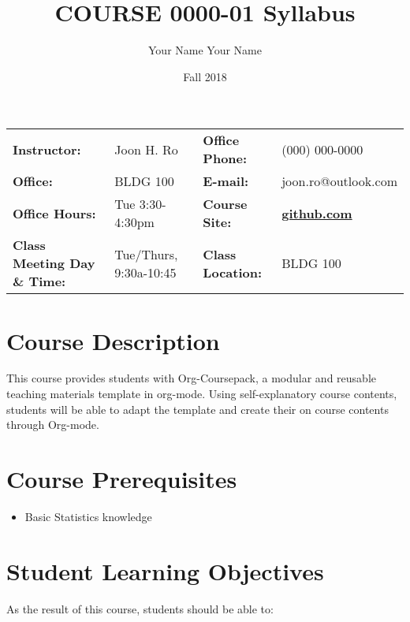 \documentclass[article,letterpaper,times,10pt,listings-bw,microtype]{scrartcl}
\author{Your Name Your Name}
\date{Fall 2018}
\title{COURSE 0000-01 Syllabus}
\begin{document}

\begin{center}
{}
\end{center}

\begin{center}
{}
\end{center}

\vspace{5 mm}

\begin{center}
\begin{tabular}{llll}
\textbf{Instructor:} & Joon H. Ro & \textbf{Office Phone:} & (000) 000-0000\\
\textbf{Office:} & BLDG 100 & \textbf{E-mail:} & joon.ro@outlook.com\\
\textbf{Office Hours:} & Tue 3:30-4:30pm & \textbf{Course Site:} & \textbf{\href{https://github.com}{github.com}}\\
\textbf{Class Meeting Day \& Time:} & Tue/Thurs, 9:30a-10:45 & \textbf{Class Location:} & BLDG 100\\
\end{tabular}
\end{center}
\section*{Course Description}
\label{sec:org2148b25}
This course provides students with Org-Coursepack, a modular and reusable
teaching materials template in org-mode. Using self-explanatory course
contents, students will be able to adapt the template and create their on
course contents through Org-mode.
\section*{Course Prerequisites}
\label{sec:org66d41c3}
\begin{itemize}
\item Basic Statistics knowledge
\end{itemize}
\section*{Student Learning Objectives}
\label{sec:orga46d8fc}
As the result of this course, students should be able to:
\end{document}
